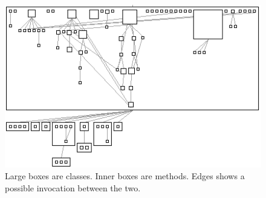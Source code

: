 \documentclass[a4paper,10pt,twoside]{book}
\begin{document}
\begin{figure}[htbp]
\centerline{\includegraphics[width=0.6\linewidth]{methodDependencies.png}}
\caption{Large boxes are classes. Inner boxes are methods. Edges shows a possible invocation between the two.}
\label{fig:abstractClasses}
\end{figure}
\end{document}

